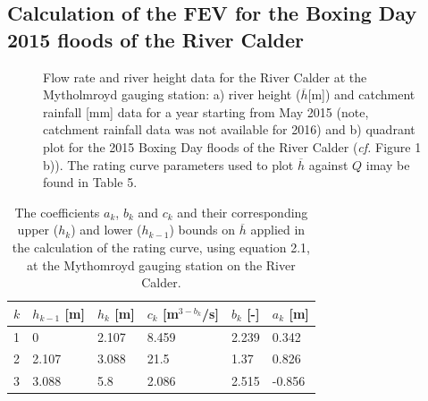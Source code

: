 \documentclass[11pt,a4paper]{article}
\begin{document}
\subsection{Calculation of the FEV for the Boxing Day 2015 floods of the River Calder}
\begin{figure}[H]
\centering
{}
\hfill
{}
\caption{Flow rate and river height data for the River Calder at the Mytholmroyd gauging station: a) river height ($\overline{h}$[m]) \cite{Calder-Don} and catchment rainfall [mm] data \cite{NRFA} for a year starting from May 2015 (note, catchment rainfall data was not available for 2016) and b) quadrant plot for the 2015 Boxing Day floods of the River Calder (\textit{cf.} Figure 1 b)). The rating curve parameters used to plot $\overline{h}$ against $Q$ imay be found in Table 5.}
\end{figure}

\begin{table}[H]
\centering
\begin{tabular}{l|l|l|l|l|l}
$k$ & $h_{k-1}$ [m] & $h_k$ [m] & $c_k$ [m$^{3-b_k}$/s] & $b_k$ [-] & $a_k$ [m]\\
\hline
1 & 0 & 2.107 & 8.459 & 2.239 & 0.342 \\
2 & 2.107 & 3.088 & 21.5 & 1.37 & 0.826 \\
3 & 3.088 & 5.8 & 2.086 & 2.515 & -0.856 \\
\end{tabular}
\caption{The coefficients $a_k$, $b_k$ and $c_k$ and their corresponding upper ($h_k$) and lower ($h_{k-1}$) bounds on $\overline{h}$ \cite{Calder-Don} applied in the calculation of the rating curve, using equation 2.1, at the Mythomroyd gauging station on the River Calder.}
\end{table}
\end{document}
